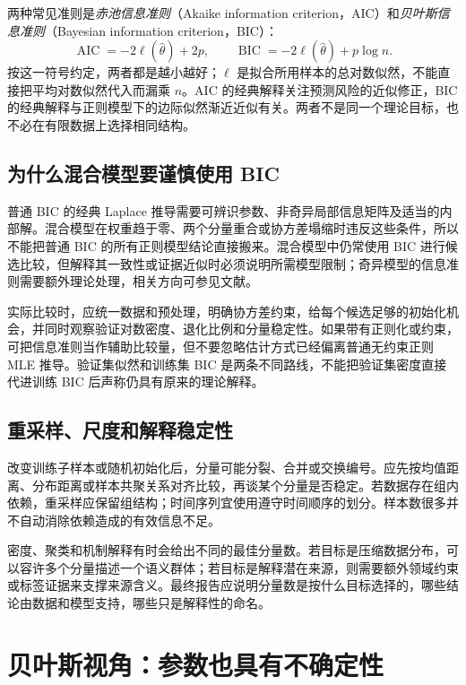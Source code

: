 \documentclass[UTF8,12pt,a4paper,fontset=fandol]{ctexart}
\begin{document}
两种常见准则是\emph{赤池信息准则}（Akaike information criterion，AIC）和\emph{贝叶斯信息准则}（Bayesian information criterion，BIC）：
\begin{equation}
\operatorname{AIC}=-2\ell(\widehat\theta)+2p,\qquad
\operatorname{BIC}=-2\ell(\widehat\theta)+p\log n.
\label{eq:gmm-information-criteria}
\end{equation}
按这一符号约定，两者都是越小越好；$\ell$ 是拟合所用样本的总对数似然，不能直接把平均对数似然代入而漏乘 $n$。AIC 的经典解释关注预测风险的近似修正，BIC 的经典解释与正则模型下的边际似然渐近近似有关。两者不是同一个理论目标，也不必在有限数据上选择相同结构。

\subsection{为什么混合模型要谨慎使用 BIC}
普通 BIC 的经典 Laplace 推导需要可辨识参数、非奇异局部信息矩阵及适当的内部解。混合模型在权重趋于零、两个分量重合或协方差塌缩时违反这些条件，所以不能把普通 BIC 的所有正则模型结论直接搬来。混合模型中仍常使用 BIC 进行候选比较，但解释其一致性或证据近似时必须说明所需模型限制；奇异模型的信息准则需要额外理论处理，相关方向可参见文献\cite{drton2013}。

实际比较时，应统一数据和预处理，明确协方差约束，给每个候选足够的初始化机会，并同时观察验证对数密度、退化比例和分量稳定性。如果带有正则化或约束，可把信息准则当作辅助比较量，但不要忽略估计方式已经偏离普通无约束正则 MLE 推导。验证集似然和训练集 BIC 是两条不同路线，不能把验证集密度直接代进训练 BIC 后声称仍具有原来的理论解释。

\subsection{重采样、尺度和解释稳定性}
改变训练子样本或随机初始化后，分量可能分裂、合并或交换编号。应先按均值距离、分布距离或样本共聚关系对齐比较，再谈某个分量是否稳定。若数据存在组内依赖，重采样应保留组结构；时间序列宜使用遵守时间顺序的划分。样本数很多并不自动消除依赖造成的有效信息不足。

密度、聚类和机制解释有时会给出不同的最佳分量数。若目标是压缩数据分布，可以容许多个分量描述一个语义群体；若目标是解释潜在来源，则需要额外领域约束或标签证据来支撑来源含义。最终报告应说明分量数是按什么目标选择的，哪些结论由数据和模型支持，哪些只是解释性的命名。

\section{贝叶斯视角：参数也具有不确定性}
\label{sec:gmm-bayesian}
\end{document}

